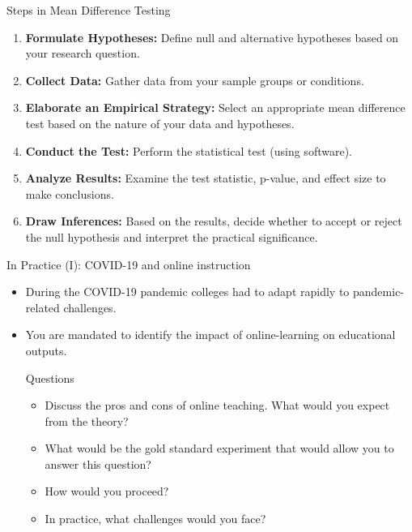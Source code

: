 \documentclass[notes,10pt, aspectratio=169]{beamer}
\begin{document}
\begin{frame}{Steps in Mean Difference Testing}
\begin{enumerate}
    \item \textbf{Formulate Hypotheses:} Define null and alternative hypotheses based on your research question.\vspace{.3cm}
    \item \textbf{Collect Data:} Gather data from your sample groups or conditions.\vspace{.3cm}
    \item \textbf{Elaborate an Empirical Strategy:} Select an appropriate mean difference test based on the nature of your data and hypotheses.\vspace{.3cm}
    \item \textbf{Conduct the Test:} Perform the statistical test (using software).\vspace{.3cm}
    \item \textbf{Analyze Results:} Examine the test statistic, p-value, and effect size to make conclusions.\vspace{.3cm}
    \item \textbf{Draw Inferences:} Based on the results, decide whether to accept or reject the null hypothesis and interpret the practical significance.
\end{enumerate}
\end{frame}


\begin{frame}{In Practice (I): COVID-19 and online instruction}
\begin{itemize}
    \item During the COVID-19 pandemic colleges had to adapt rapidly to pandemic-related challenges.
    \item You are mandated to identify the impact of online-learning on educational outputs. 

    \begin{exampleblock}{Questions}
    \begin{itemize}
        \item Discuss the pros and cons of online teaching. What would you expect from the theory?
        \item What would be the gold standard experiment that would allow you to answer this question?
        \item How would you proceed?
        \item In practice, what challenges would you face?
    \end{itemize}
    \end{exampleblock}
\end{itemize}
\end{frame}
\end{document}
